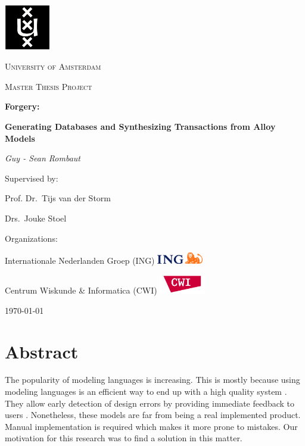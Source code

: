 \documentclass[oneside]{book}
\begin{document}
\begin{titlepage}
	\centering
	\includegraphics[width=0.15\textwidth]{logo-uva}\par\vspace{2.5mm}
	{\scshape\LARGE University of Amsterdam \par}
	\vspace{2mm}
	{\scshape\Large Master Thesis Project\par}
	\vspace{1.5cm}
	{\Huge\bfseries Forgery:\par}
	{\huge\bfseries Generating Databases and Synthesizing Transactions  from Alloy Models\par}
	\vspace{1cm}
	{\Large\itshape Guy - Sean Rombaut\par}
	\vfill
	Supervised by:\par
	Prof. Dr.~Tijs van der Storm\par
	Drs.~Jouke Stoel\par
	\vspace{1cm}
	Organizations:\par
		 Internationale Nederlanden Groep (ING) \hfill  \includegraphics[width=0.15\textwidth]{ING}\par
	 Centrum Wiskunde \& Informatica (CWI)  \hfill  \includegraphics[width=0.15\textwidth]{CWIlogo}

	\vfill

	{\large \today\par}
\end{titlepage}

\tableofcontents
\newpage

\chapter{Abstract}
The popularity of modeling languages is increasing. This is mostly because using modeling languages is an efficient way to end up with a high quality system \cite[p. ~6]{abstractions}. They allow early detection of design errors by providing immediate feedback to users \cite{lightning}. Nonetheless, these models are far from being a real implemented product. Manual implementation is required which makes it more prone to mistakes. Our motivation for this research was to find a solution in this matter.\\
\end{document}
